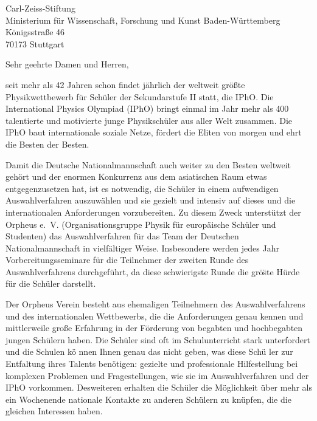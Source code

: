 \documentclass[../style/orpheus,fontsize=11pt]{scrlttr2}
\begin{document}

\begin{letter}{
\noindent Carl-Zeiss-Stiftung \\
Ministerium f\"ur Wissenschaft, Forschung und Kunst Baden-W\"urttemberg \\
K\"onigsstra\ss e 46\\
70173 Stuttgart
}



\opening{Sehr geehrte Damen und Herren,}

seit mehr als 42 Jahren schon findet j\"ahrlich der weltweit gr\"o\ss te Physikwettbewerb f\"ur Sch\"uler der Sekundarstufe II statt, die IPhO.  Die International Physics Olympiad (IPhO) bringt einmal im Jahr mehr als 400 talentierte und motivierte junge Physiksch\"uler aus aller Welt zusammen.  Die IPhO baut internationale soziale Netze, f\"ordert die Eliten von morgen und ehrt die Besten der Besten.

Damit die Deutsche Nationalmannschaft auch weiter zu den Besten weltweit geh\"ort und der enormen Konkurrenz aus dem asiatischen Raum etwas entgegenzusetzen hat, ist es notwendig, die Sch\"uler in einem aufwendigen Auswahlverfahren auszuw\"ahlen und sie gezielt und intensiv auf dieses und die internationalen Anforderungen vorzubereiten.  Zu diesem Zweck unterst\"utzt der Orpheus e.\, V. (Organisationsgruppe Physik f\"ur europ\"aische Sch\"uler und Studenten) das Auswahlverfahren f\"ur das Team der Deutschen Nationalmannschaft in vielf\"altiger Weise.  Insbesondere werden jedes Jahr Vorbereitungsseminare f\"ur die Teilnehmer der zweiten Runde des Auswahlverfahrens durchgef\"uhrt, da diese schwierigste Runde die gr\"o\"ste H\"urde f\"ur die Sch\"uler darstellt.

Der Orpheus Verein besteht aus ehemaligen Teilnehmern des Auswahlverfahrens und des internationalen Wettbewerbs, die die Anforderungen genau kennen und mittlerweile gro\ss e Erfahrung in der F\"orderung von begabten und hochbegabten jungen Sch\"ulern haben.  Die Sch\"uler sind oft im Schulunterricht stark unterfordert und die Schulen k\"o nnen Ihnen genau das nicht geben, was diese Sch\"u ler zur Entfaltung ihres Talents ben\"otigen: gezielte und professionale Hilfestellung bei komplexen Problemen und Fragestellungen, wie sie im Auswahlverfahren und der IPhO vorkommen.  Desweiteren erhalten die Sch\"uler die M\"oglichkeit \"uber mehr als ein Wochenende nationale Kontakte zu anderen Sch\"ulern zu kn\"upfen, die die gleichen Interessen haben.


\end{letter}
\end{document}
